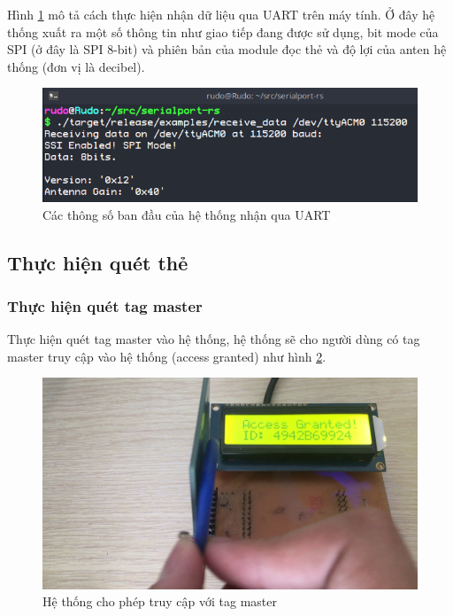 \newpage
Hình \ref{fig:UART_init_receive} mô tả cách thực hiện nhận dữ liệu qua UART trên máy tính.
Ở đây hệ thống xuất ra một số thông tin như giao tiếp đang được sử dụng, bit mode của SPI (ở đây là SPI 8-bit)
và phiên bản của module đọc thẻ và độ lợi của anten hệ thống (đơn vị là \si{decibel}).
\begin{figure}[ht]
\centering
\includegraphics[scale=0.8]{images/UART_init_receive.png}
\caption{Các thông số ban đầu của hệ thống nhận qua UART}
\label{fig:UART_init_receive}
\end{figure}

\subsection{Thực hiện quét thẻ}
\subsubsection{Thực hiện quét tag master}
Thực hiện quét tag master vào hệ thống, hệ thống sẽ cho người dùng có tag master truy cập vào hệ thống (access granted) như hình \ref{fig:tag}.
\begin{figure}[ht]
\centering
\includegraphics[scale=0.3]{images/tag.jpg}
\caption{Hệ thống cho phép truy cập với tag master}
\label{fig:tag}
\end{figure}

\newpage
